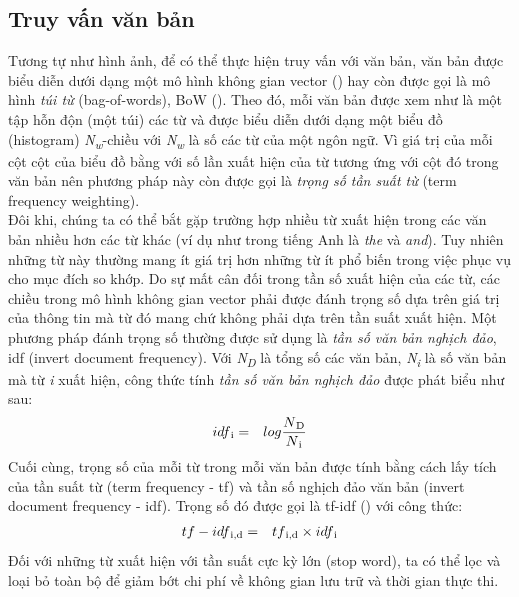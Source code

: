 \subsection{Truy vấn văn bản}
Tương tự như hình ảnh, để có thể thực hiện truy vấn với văn bản, văn bản được biểu diễn dưới dạng một mô hình không gian vector (\cite{Salton:1986:IMI:576628}) hay còn được gọi là mô hình \textit{túi từ} (bag-of-words), BoW (\cite{manning2008introduction}). Theo đó, mỗi văn bản được xem như là một tập hỗn độn (một túi) các từ và được biểu diễn dưới dạng một biểu đồ (histogram) \textit{N\textsubscript{w}}-chiều với \textit{N\textsubscript{w}} là số các từ của một ngôn ngữ. Vì giá trị của mỗi cột cột của biểu đồ bằng với số lần xuất hiện của từ tương ứng với cột đó trong văn bản nên phương pháp này còn được gọi là \textit{trọng số tần suất từ} (term frequency weighting).\\
Đôi khi, chúng ta có thể bắt gặp trường hợp nhiều từ xuất hiện trong các văn bản nhiều hơn các từ khác (ví dụ như trong tiếng Anh là \textit{the} và \textit{and}). Tuy nhiên những từ này thường mang ít giá trị hơn những từ ít phổ biến trong việc phục vụ cho mục đích so khớp. Do sự mất cân đối trong tần số xuất hiện của các từ, các chiều trong mô hình không gian vector phải được đánh trọng số dựa trên giá trị của thông tin mà từ đó mang chứ không phải dựa trên tần suất xuất hiện. Một phương pháp đánh trọng số thường được sử dụng là \textit{tần số văn bản nghịch đảo}, idf (invert document frequency). Với \textit{N\textsubscript{D}} là tổng số các văn bản, \textit{N\textsubscript{i}} là số văn bản mà từ \textit{i} xuất hiện, công thức tính \textit{tần số văn bản nghịch đảo} được phát biểu như sau:
\begin{eqnarray}
 idf\textsubscript{i} &=& log \frac{N\textsubscript{D}}{N\textsubscript{i}}
\end{eqnarray}
Cuối cùng, trọng số của mỗi từ trong mỗi văn bản được tính bằng cách lấy tích của tần suất từ (term frequency - tf) và tần số nghịch đảo văn bản (invert document frequency - idf). Trọng số đó được gọi là tf-idf (\cite{manning2008introduction}) với công thức:
\begin{eqnarray}
 tf-idf\textsubscript{i,d} &=& tf\textsubscript{i,d} \times idf\textsubscript{i}
\end{eqnarray}
Đối với những từ xuất hiện với tần suất cực kỳ lớn (stop word), ta có thể lọc và loại bỏ toàn bộ để giảm bớt chi phí về không gian lưu trữ và thời gian thực thi.\\
